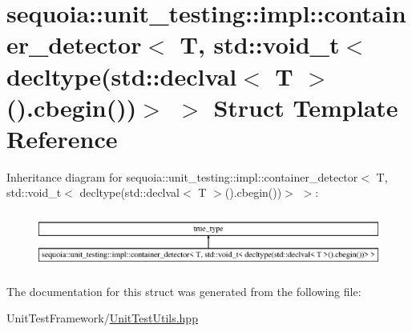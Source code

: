 \hypertarget{structsequoia_1_1unit__testing_1_1impl_1_1container__detector_3_01_t_00_01std_1_1void__t_3_01dec245f725d5cba5ca64124d0549f4fe663}{}\section{sequoia\+::unit\+\_\+testing\+::impl\+::container\+\_\+detector$<$ T, std\+::void\+\_\+t$<$ decltype(std\+::declval$<$ T $>$().cbegin())$>$ $>$ Struct Template Reference}
\label{structsequoia_1_1unit__testing_1_1impl_1_1container__detector_3_01_t_00_01std_1_1void__t_3_01dec245f725d5cba5ca64124d0549f4fe663}
Inheritance diagram for sequoia\+::unit\+\_\+testing\+::impl\+::container\+\_\+detector$<$ T, std\+::void\+\_\+t$<$ decltype(std\+::declval$<$ T $>$().cbegin())$>$ $>$\+:\begin{figure}[H]
\begin{center}
\leavevmode
\includegraphics[height=1.882353cm]{structsequoia_1_1unit__testing_1_1impl_1_1container__detector_3_01_t_00_01std_1_1void__t_3_01dec245f725d5cba5ca64124d0549f4fe663}
\end{center}
\end{figure}


The documentation for this struct was generated from the following file\+:\begin{DoxyCompactItemize}
\item 
Unit\+Test\+Framework/\mbox{\hyperlink{_unit_test_utils_8hpp}{Unit\+Test\+Utils.\+hpp}}\end{DoxyCompactItemize}
